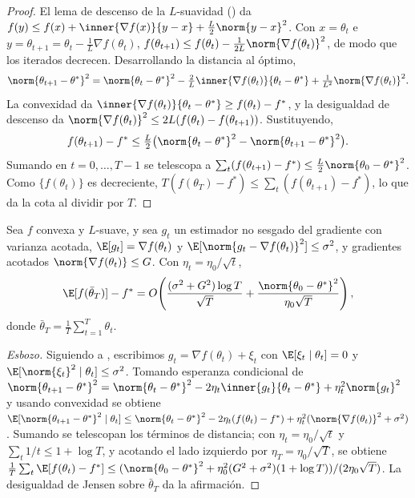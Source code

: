 \begin{proof}
El lema de descenso de la $L$-suavidad () da $f(y) \le f(x) +
\inner{\nabla f(x)}{y - x} + \frac{L}{2}\norm{y - x}^2$. Con $x = \theta_t$ e
$y = \theta_{t+1} = \theta_t - \frac{1}{L}\nabla f(\theta_t)$, $f(\theta_{t+1}) \le
f(\theta_t) - \frac{1}{2L}\norm{\nabla f(\theta_t)}^2$, de modo que los iterados
decrecen. Desarrollando la distancia al \'optimo,
\[
  \norm{\theta_{t+1} - \theta^*}^2 = \norm{\theta_t - \theta^*}^2
  - \tfrac{2}{L}\inner{\nabla f(\theta_t)}{\theta_t - \theta^*}
  + \tfrac{1}{L^2}\norm{\nabla f(\theta_t)}^2.
\]
La convexidad da $\inner{\nabla f(\theta_t)}{\theta_t - \theta^*} \ge f(\theta_t)
- f^*$, y la desigualdad de descenso da $\norm{\nabla f(\theta_t)}^2 \le
2L(f(\theta_t) - f(\theta_{t+1}))$. Sustituyendo,
\[
  f(\theta_{t+1}) - f^* \le \tfrac{L}{2}\bigl(\norm{\theta_t - \theta^*}^2
  - \norm{\theta_{t+1} - \theta^*}^2\bigr).
\]
Sumando en $t = 0, \ldots, T-1$ se telescopa a $\sum_t (f(\theta_{t+1}) - f^*) \le
\frac{L}{2}\norm{\theta_0 - \theta^*}^2$. Como $\{f(\theta_t)\}$ es decreciente,
$T(f(\theta_T) - f^*) \le \sum_t (f(\theta_{t+1}) - f^*)$, lo que da la cota al
dividir por $T$.
\end{proof}

\begin{theorem}
\label{thm:found:sgd-convergence}
Sea $f$ convexa y $L$-suave, y sea $g_t$ un estimador no sesgado del gradiente con
varianza acotada, $\E[g_t] = \nabla f(\theta_t)$ y $\E[\norm{g_t - \nabla
f(\theta_t)}^2] \le \sigma^2$, y gradientes acotados $\norm{\nabla f(\theta_t)} \le
G$. Con $\eta_t = \eta_0/\sqrt{t}$,
\[
  \E[f(\bar\theta_T)] - f^* = O\!\left(\frac{(\sigma^2 + G^2)\log T}{\sqrt{T}}
  + \frac{\norm{\theta_0 - \theta^*}^2}{\eta_0\sqrt{T}}\right),
\]
donde $\bar\theta_T = \frac{1}{T}\sum_{t=1}^T \theta_t$.
\end{theorem}

\begin{proof}[Esbozo]
Siguiendo a \citet{bottou2018optimization}, escribimos $g_t = \nabla f(\theta_t) +
\xi_t$ con $\E[\xi_t \mid \theta_t] = 0$ y $\E[\norm{\xi_t}^2 \mid \theta_t] \le
\sigma^2$. Tomando esperanza condicional de $\norm{\theta_{t+1} - \theta^*}^2 =
\norm{\theta_t - \theta^*}^2 - 2\eta_t \inner{g_t}{\theta_t - \theta^*} +
\eta_t^2\norm{g_t}^2$ y usando convexidad se obtiene $\E[\norm{\theta_{t+1} -
\theta^*}^2 \mid \theta_t] \le \norm{\theta_t - \theta^*}^2 - 2\eta_t(f(\theta_t)
- f^*) + \eta_t^2(\norm{\nabla f(\theta_t)}^2 + \sigma^2)$. Sumando se telescopan
los t\'erminos de distancia; con $\eta_t = \eta_0/\sqrt{t}$ y $\sum_t 1/t \le 1 +
\log T$, y acotando el lado izquierdo por $\eta_T = \eta_0/\sqrt{T}$, se obtiene
$\frac{1}{T}\sum_t \E[f(\theta_t) - f^*] \le (\norm{\theta_0 - \theta^*}^2 +
\eta_0^2(G^2 + \sigma^2)(1 + \log T))/(2\eta_0\sqrt{T})$. La desigualdad de Jensen
sobre $\bar\theta_T$ da la afirmaci\'on.
\end{proof}


